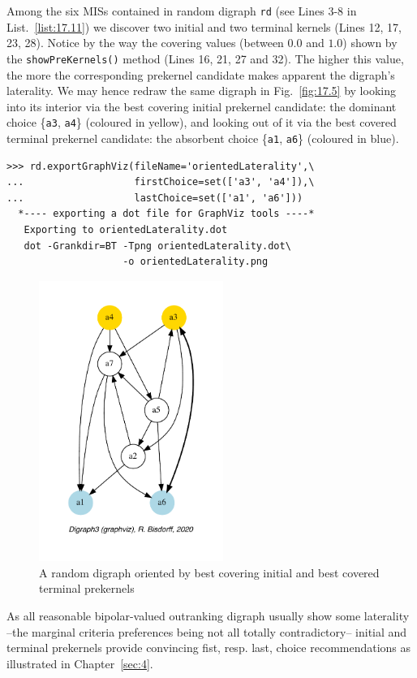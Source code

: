 Among the six MISs contained in random digraph \texttt{rd} (see Lines 3-8 in List.~\vref{list:17.11}) we discover two initial and two terminal kernels (Lines 12, 17, 23, 28). Notice by the way the covering values (between $0.0$ and $1.0$) shown by the \texttt{showPreKernels()} method (Lines 16, 21, 27 and 32). The higher this value, the more the corresponding prekernel candidate makes apparent the digraph's laterality. We may hence redraw the same digraph in Fig.~\vref{fig:17.5} by looking into its interior via the best covering initial prekernel candidate: the dominant choice \{\texttt{a3}, \texttt{a4}\} (coloured in yellow), and looking out of it via the best covered terminal prekernel candidate: the absorbent choice \{\texttt{a1}, \texttt{a6}\} (coloured in blue).
\begin{lstlisting}
>>> rd.exportGraphViz(fileName='orientedLaterality',\
...                   firstChoice=set(['a3', 'a4']),\
...                   lastChoice=set(['a1', 'a6']))
  *---- exporting a dot file for GraphViz tools ----*
   Exporting to orientedLaterality.dot
   dot -Grankdir=BT -Tpng orientedLaterality.dot\
                    -o orientedLaterality.png
\end{lstlisting}
\begin{figure}[ht]
\sidecaption[t]
\includegraphics[width=6cm]{Figures/17-5-orientedLaterality.pdf}
\caption{A random digraph oriented by best covering initial and
   best covered terminal prekernels}
\label{fig:17.5}       %
\end{figure}

As all reasonable bipolar-valued outranking digraph usually show some laterality --the marginal criteria preferences being not all totally contradictory-- initial and terminal prekernels provide convincing fist, resp. last, choice recommendations as illustrated in Chapter~\vref{sec:4}.


